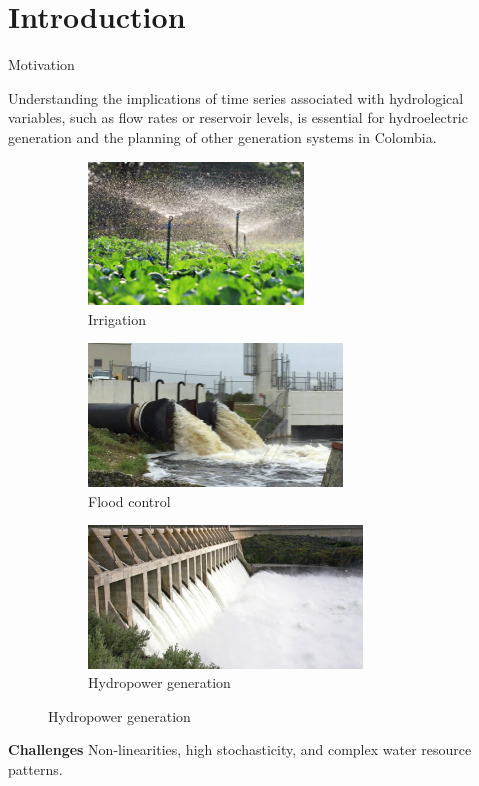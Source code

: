 \section*{Introduction}
\begin{frame}{Motivation}
	\begin{block}{}
	Understanding the implications of time series associated with hydrological variables, such as flow rates or reservoir levels, is essential for hydroelectric generation and the planning of other generation systems in Colombia.
	\end{block}
	\begin{figure}
		\centering
		\begin{subfigure}[b]{0.3\textwidth}
			\centering
			\includegraphics[width=\textwidth, height=3.8cm]{images/irrigation.jpg}
			\caption{Irrigation}
		\end{subfigure}
		\hfill
		\begin{subfigure}[b]{0.3\textwidth}
			\centering
			\includegraphics[width=\textwidth, height=3.8cm]{images/flood_control.jpeg}
			\caption{Flood control}
		\end{subfigure}
		\hfill
		\begin{subfigure}[b]{0.3\textwidth}
			\centering
			\includegraphics[width=\textwidth, height=3.8cm]{images/hydro_gen.jpeg}
			\caption{Hydropower generation}
		\end{subfigure}
		
	\end{figure}
	\begin{block}{\textcolor{myNewColorB}{\textbf{Challenges}}}
	Non-linearities, high stochasticity, and complex water resource patterns.
	\end{block}
	
\end{frame}

